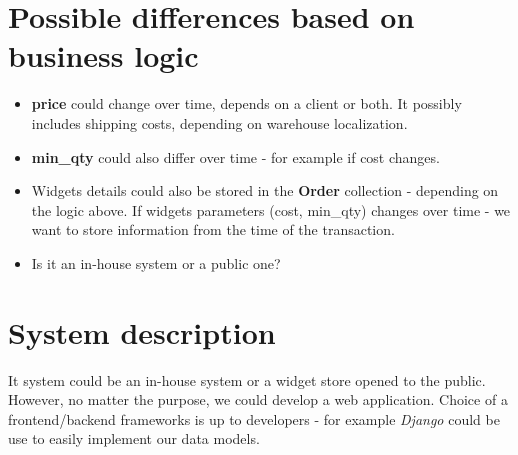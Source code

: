 \documentclass[8pt, a4paper]{article}
\begin{document}
\section*{Possible differences based on business logic}

\begin{itemize}
    \item \textbf{price} could change over time, depends on a client or both. It possibly includes shipping costs, depending on warehouse localization.
    \item \textbf{min\_qty} could also differ over time - for example if cost changes.
    \item Widgets details could also be stored in the \textbf{Order} collection - depending on the logic above. If widgets parameters (cost, min\_qty) changes over time - we want to store information from the time of the transaction.
    \item Is it an in-house system or a public one?
\end{itemize}

\section*{System description}

It system could be an in-house system or a widget store opened to the public. However, no matter the purpose, we could develop a web application.
Choice of a frontend/backend frameworks is up to developers - for example \textit{Django} could be use to easily implement our data models.
\end{document}
